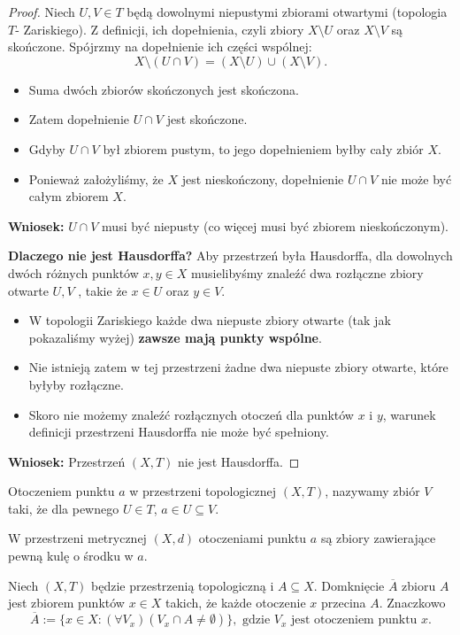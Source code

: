 \begin{proof}
	Niech $U,V \in T$ będą dowolnymi niepustymi zbiorami otwartymi (topologia $T$- Zariskiego). Z definicji, ich dopełnienia, czyli zbiory $X\setminus U$ oraz $X\setminus V$ są skończone. Spójrzmy na dopełnienie ich części wspólnej:
	 \[
	X\setminus \left( U\cap V \right) = \left( X\setminus U \right) \cup \left( X\setminus V \right) 
	.\] 
	\begin{itemize}
		\item Suma dwóch zbiorów skończonych jest skończona.
		\item Zatem dopełnienie $U\cap V$ jest skończone.
		\item Gdyby $U\cap V$ był zbiorem pustym, to jego dopełnieniem byłby cały zbiór $X$.
		\item Ponieważ założyliśmy, że $X$ jest nieskończony, dopełnienie $U\cap V$ nie może być całym zbiorem $X$.
	\end{itemize}
	\noindent \textbf{Wniosek:} $U\cap V$ musi być niepusty (co więcej musi być zbiorem nieskończonym).

\noindent \textbf{Dlaczego nie jest Hausdorffa?} Aby przestrzeń  była Hausdorffa, dla dowolnych dwóch różnych punktów $x,y \in X$ musielibyśmy znaleźć dwa rozłączne zbiory otwarte $U,V$ , takie że $x \in U$ oraz $y \in V$.
\begin{itemize}
	\item W topologii Zariskiego każde dwa niepuste zbiory otwarte (tak jak pokazaliśmy wyżej) \textbf{zawsze mają punkty wspólne}.
	\item Nie istnieją zatem w tej przestrzeni żadne dwa niepuste zbiory otwarte, które byłyby rozłączne.
	\item Skoro nie możemy znaleźć rozłącznych otoczeń dla punktów $x$ i $y$, warunek definicji przestrzeni Hausdorffa nie może być spełniony.
\end{itemize}
\noindent \textbf{Wniosek:} Przestrzeń $\left( X,T \right) $ nie jest Hausdorffa.
\end{proof} 
\begin{definition}[Otoczenie]
	Otoczeniem punktu $a$ w przestrzeni topologicznej $\left( X,T \right) $, nazywamy zbiór $V$ taki, że dla pewnego $U\in T$, $a \in U \subseteq V$.
\end{definition} 

W przestrzeni metrycznej $\left( X,d \right) $ otoczeniami punktu $a$ są zbiory zawierające pewną kulę o środku w $a$.

\begin{definition}
	Niech $\left( X,T \right) $ będzie przestrzenią topologiczną i $A \subseteq X$. Domknięcie $\overline{A}$ zbioru $A$ jest zbiorem punktów $x \in X$ takich, że każde otoczenie $x$ przecina $A$. Znaczkowo
	\[
	\overline{A} := \{x \in X: \left(\forall V_{x} \right) \left( V_{x}\cap A \neq \emptyset \right)  \}, \text{ gdzie } V_{x} \text{ jest otoczeniem punktu } x
	.\] 
\end{definition} 


